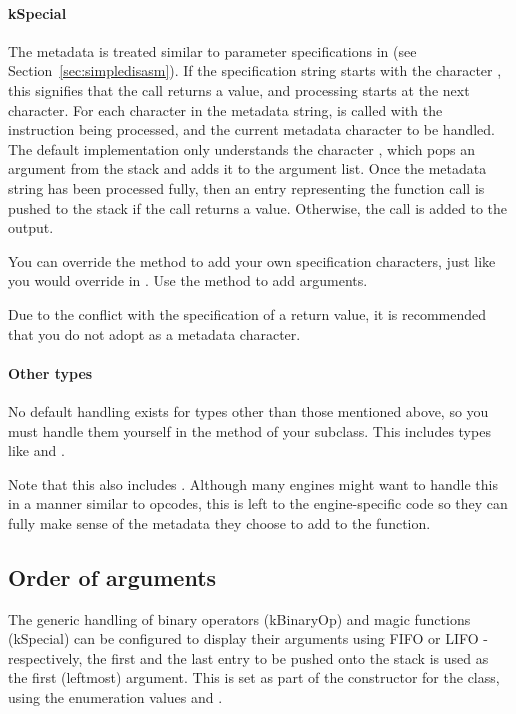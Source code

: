 \paragraph{kSpecial}
The metadata is treated similar to parameter specifications in  (see Section~\vref{sec:simpledisasm}). If the specification string starts with the character , this signifies that the call returns a value, and processing starts at the next character.
For each character in the metadata string,  is called with the instruction being processed, and the current metadata character to be handled. The default implementation only understands the character , which pops an argument from the stack and adds it to the argument list.
Once the metadata string has been processed fully, then an entry representing the function call is pushed to the stack if the call returns a value. Otherwise, the call is added to the output.

You can override the  method to add your own specification characters, just like you would override  in . Use the  method to add arguments.

Due to the conflict with the specification of a return value, it is recommended that you do not adopt  as a metadata character.

\paragraph{Other types}
No default handling exists for types other than those mentioned above, so you must handle them yourself in the  method of your subclass. This includes types like  and .

Note that this also includes . Although many engines might want to handle this in a manner similar to  opcodes, this is left to the engine-specific code so they can fully make sense of the metadata they choose to add to the function.

\subsection{Order of arguments}
\label{sec:argOrder}
The generic handling of binary operators (kBinaryOp) and magic functions (kSpecial) can be configured to display their arguments using FIFO or LIFO - respectively, the first and the last entry to be pushed onto the stack is used as the first (leftmost) argument. This is set as part of the constructor for the  class, using the enumeration values  and .

